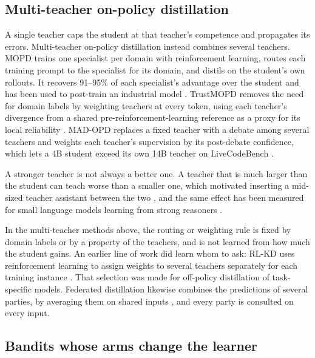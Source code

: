 \subsection{Multi-teacher on-policy distillation}
\label{sec:lr-multiteacher}

A single teacher caps the student at that teacher's competence and propagates its
errors. Multi-teacher on-policy distillation instead combines several teachers. MOPD
trains one specialist per domain with reinforcement learning, routes each training
prompt to the specialist for its domain, and distils on the student's own rollouts. It
recovers 91--95\% of each specialist's advantage over the student and has been used to
post-train an industrial model \autocite{ma_mopd_2026}. TrustMOPD removes the need for
domain labels by weighting teachers at every token, using each teacher's divergence
from a shared pre-reinforcement-learning reference as a proxy for its local
reliability \autocite{sun_trustmopd_2026}. MAD-OPD replaces a fixed teacher with a
debate among several teachers and weights each teacher's supervision by its
post-debate confidence, which lets a 4B student exceed its own 14B teacher on
LiveCodeBench \autocite{wang_madopd_2026}.

A stronger teacher is not always a better one. A teacher that is much larger than the
student can teach worse than a smaller one, which motivated inserting a mid-sized
teacher assistant between the two \autocite{mirzadeh_ta_2020}, and the same effect has
been measured for small language models learning from strong reasoners
\autocite{li_learnability_gap_2025}.

In the multi-teacher methods above, the routing or weighting rule is fixed by domain
labels or by a property of the teachers, and is not learned from how much the student
gains. An earlier line of work did learn whom to ask: RL-KD uses reinforcement
learning to assign weights to several teachers separately for each training instance
\autocite{yuan_rlkd_2021}. That selection was made for off-policy distillation of
task-specific models. Federated distillation likewise combines the predictions of
several parties, by averaging them on shared inputs
\autocite{li_fedmd_2019,lin_feddf_2020,fan_fedmkt_2025}, and every party is consulted
on every input.

\subsection{Bandits whose arms change the learner}
\label{sec:lr-selection}


